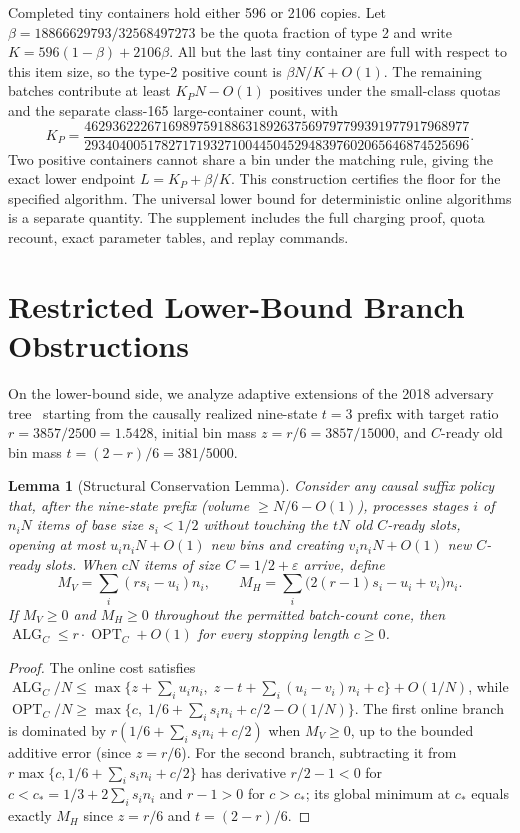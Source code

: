 \documentclass[11pt,letterpaper]{article}
\newtheorem{lemma}[theorem]{Lemma}
\theoremstyle{definition}
\theoremstyle{remark}
\newcommand{\OPT}{\operatorname{OPT}}
\newcommand{\ALG}{\operatorname{ALG}}
\begin{document}
Completed tiny containers hold either 596 or 2106 copies. Let $\beta=18866629793/32568497273$ be the quota fraction of type 2 and write $K=596(1-\beta)+2106\beta$. All but the last tiny container are full with respect to this item size, so the type-2 positive count is $\beta N/K+O(1)$. The remaining batches contribute at least $K_P N-O(1)$ positives under the small-class quotas and the separate class-165 large-container count, with
\[
 K_P=\frac{4629362226716989759188631892637569797799391977917968977}
 {2934040051782717193271004450452948397602065646874525696}.
\]
Two positive containers cannot share a bin under the matching rule, giving the exact lower endpoint $L=K_P+\beta/K$. This construction certifies the floor for the specified algorithm. The universal lower bound for deterministic online algorithms is a separate quantity. The supplement includes the full charging proof, quota recount, exact parameter tables, and replay commands.

\section{Restricted Lower-Bound Branch Obstructions}
On the lower-bound side, we analyze adaptive extensions of the 2018 adversary tree~\cite{Balogh2019LB} starting from the causally realized nine-state $t=3$ prefix with target ratio $r = 3857/2500 = 1.5428$, initial bin mass $z = r/6 = 3857/15000$, and $C$-ready old bin mass $t = (2-r)/6 = 381/5000$.

\begin{lemma}[Structural Conservation Lemma]\label{lem:conservation}
Consider any causal suffix policy that, after the nine-state prefix (volume $\ge N/6-O(1)$), processes stages $i$ of $n_i N$ items of base size $s_i < 1/2$ without touching the $tN$ old $C$-ready slots, opening at most $u_i n_i N + O(1)$ new bins and creating $v_i n_i N + O(1)$ new $C$-ready slots. When $cN$ items of size $C = 1/2+\varepsilon$ arrive, define
\[
  M_V = \sum_i (r s_i - u_i) n_i, \qquad
  M_H = \sum_i \bigl(2(r-1)s_i - u_i + v_i\bigr) n_i.
\]
If $M_V \ge 0$ and $M_H \ge 0$ throughout the permitted batch-count cone, then $\ALG_C \le r\cdot \OPT_C + O(1)$ for every stopping length $c \ge 0$.
\end{lemma}
\begin{proof}
The online cost satisfies $\ALG_C/N \le \max\{z + \sum_i u_i n_i,\; z - t + \sum_i (u_i - v_i) n_i + c\} + O(1/N)$, while $\OPT_C/N \ge \max\{c,\; 1/6 + \sum_i s_i n_i + c/2 - O(1/N)\}$. The first online branch is dominated by $r(1/6 + \sum_i s_i n_i + c/2)$ when $M_V \ge 0$, up to the bounded additive error (since $z=r/6$). For the second branch, subtracting it from $r\max\{c, 1/6+\sum_i s_i n_i + c/2\}$ has derivative $r/2-1 < 0$ for $c < c_* = 1/3 + 2\sum_i s_i n_i$ and $r-1 > 0$ for $c > c_*$; its global minimum at $c_*$ equals exactly $M_H$ since $z=r/6$ and $t=(2-r)/6$.
\end{proof}
\end{document}
